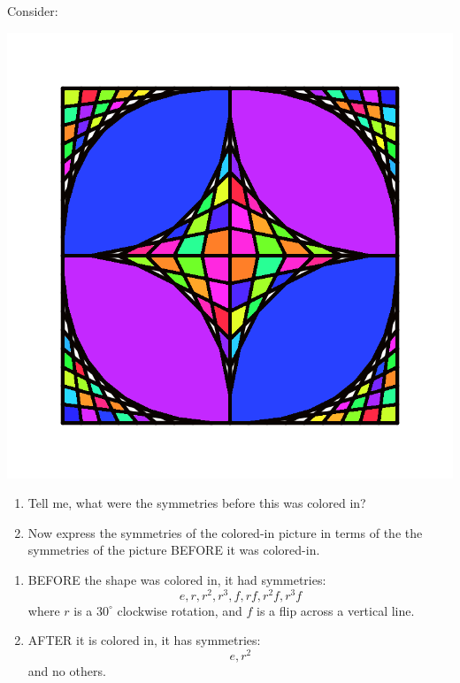 \documentclass[noauthor,nooutcomes,hints]{ximera}
\begin{document}
\begin{question}
 Consider:
 \begin{center}
  \includegraphics[width=.6\textwidth]{qR2D4.png}
 \end{center}
 \begin{enumerate}
 \item Tell me, what were the symmetries before this was colored in?
 \item Now express the symmetries of the colored-in picture in terms
    of the the symmetries of the picture BEFORE it was colored-in.
 \end{enumerate}
  \begin{freeResponse}
    \begin{enumerate}
    \item BEFORE the shape was colored in, it had symmetries:
      \[
      e,r,r^2,r^3, f, rf,r^2f,r^3f
      \]
      where $r$ is a $30^\circ$ clockwise rotation, and $f$ is a flip
      across a vertical line.
    \item AFTER it is colored in, it has symmetries:
      \[
      e,r^2
      \]
      and no others.
    \end{enumerate}
  \end{freeResponse}

\end{question}
\mynewpage
\end{document}
